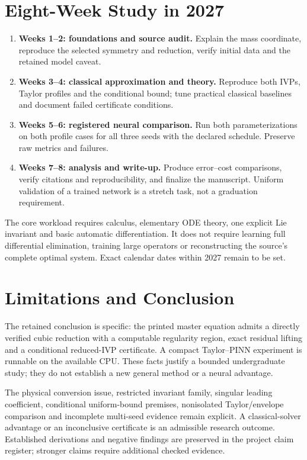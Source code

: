 \documentclass[11pt,a4paper]{article}
\theoremstyle{definition}
\theoremstyle{remark}
\begin{document}
\section{Eight-Week Study in 2027}\label{sec:plan}
\begin{enumerate}
\item \textbf{Weeks 1--2: foundations and source audit.} Explain the mass coordinate, reproduce the selected symmetry and reduction, verify initial data and the retained model caveat.
\item \textbf{Weeks 3--4: classical approximation and theory.} Reproduce both IVPs, Taylor profiles and the conditional bound; tune practical classical baselines and document failed certificate conditions.
\item \textbf{Weeks 5--6: registered neural comparison.} Run both parameterizations on both profile cases for all three seeds with the declared schedule. Preserve raw metrics and failures.
\item \textbf{Weeks 7--8: analysis and write-up.} Produce error--cost comparisons, verify citations and reproducibility, and finalize the manuscript. Uniform validation of a trained network is a stretch task, not a graduation requirement.
\end{enumerate}
The core workload requires calculus, elementary ODE theory, one explicit Lie invariant and basic automatic differentiation. It does not require learning full differential elimination, training large operators or reconstructing the source's complete optimal system. Exact calendar dates within 2027 remain to be set.

\section{Limitations and Conclusion}\label{sec:conclusion}
The retained conclusion is specific: the printed master equation admits a directly verified cubic reduction with a computable regularity region, exact residual lifting and a conditional reduced-IVP certificate. A compact Taylor--PINN experiment is runnable on the available CPU. These facts justify a bounded undergraduate study; they do not establish a new general method or a neural advantage.

The physical conversion issue, restricted invariant family, singular leading coefficient, conditional uniform-bound premises, nonisolated Taylor/envelope comparison and incomplete multi-seed evidence remain explicit. A classical-solver advantage or an inconclusive certificate is an admissible research outcome. Established derivations and negative findings are preserved in the project claim register; stronger claims require additional checked evidence.
\end{document}
